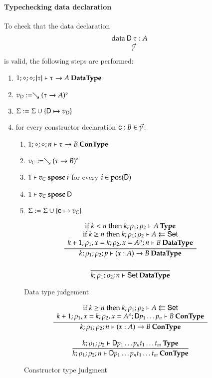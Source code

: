 \newcommand{\sposc}[3]{#1\vdash#2\mbox{ \textbf{sposc} }#3}
\newcommand{\spos}[3]{#1\vdash#2\mbox{ \textbf{spos} }#3}

\paragraph*{Typechecking data declaration}


To check that the data declaration
\[\begin{array}{l}
\data \DD \: \tau : A \\
\spcx \vec{\gamma}
\end{array}
\]
is valid, the following steps are performed: 
\begin{enumerate}
\item
$1;\diamond;\diamond;\vert\tau\vert\vdash \tau \rightarrow A\:\mathbf{DataType}$
\item
$v_D := \searrow (\tau \rightarrow A)^{\diamond}$
\item
$\mathrm{\Sigma} := \mathrm{\Sigma} \cup \{\mathsf{D} \mapsto v_D\}$
\item
for every constructor declaration $\mathsf{c} : B  \in \vec{\gamma}$:
\begin{enumerate} 
\item
$1;\diamond;\diamond;n\vdash\tau \rightarrow B\:\mathbf{ConType}$
\item
$v_C := \searrow (\tau \rightarrow B)^{\diamond}$
\item
$\sposc{1}{v_C}{i}$ for every $i \in \mbox{pos}(\mathsf{D}) $ 
\item
$\sposc{1}{v_C}{\DD}$
\item
$\mathrm{\Sigma} := \mathrm{\Sigma} \cup \{\mathsf{c} \mapsto v_C\}$
\end{enumerate}
\end{enumerate}

\newcommand{\nocc}[3]{#1\vdash#2\mbox{ \textbf{nocc} }#3}

\begin{figure}[p]
\begin{gather*}
\ \dfrac{\begin{array}[b]{c}\mbox {if } k < n \mbox{ then } k;\rho_1;\rho_2\vdash A\:\mathbf{Type}\\\mbox {if } k \geq n \mbox { then } k;\rho_1;\rho_2\vdash A\leftleftarrows\mathsf{Set}\\k+1;\rho_1,x=k;\rho_2,x=A^{\rho};n\vdash B\:\mathbf{DataType}\end{array}}{k;\rho_1;\rho_2;p\vdash( x : A ) \rightarrow{B}\:\mathbf{DataType}}
\\[2ex]
\ \dfrac{}{k;\rho_1;\rho_2;n\vdash\mathsf{Set}\:\mathbf{DataType}}
\end{gather*}
\caption{Data type judgement}
\end{figure}

\begin{figure}[p]
\begin{gather*}
\ \dfrac{\begin{array}[b]{c}\mbox {if } k \geq n \mbox { then } k;\rho_1;\rho_2\vdash A\leftleftarrows\mathsf{Set}\\k+1;\rho_1,x=k;\rho_2,x=A^{\rho};\mathsf{D} p_1 \ldots p_n\vdash B\:\mathbf{ConType}\end{array}}{k;\rho_1;\rho_2;n\vdash( x : A ) \rightarrow{B}\:\mathbf{ConType}}
\\[2ex]
\ \dfrac{k;\rho_1;\rho_2\vdash\mathsf{D} p_1 \ldots p_n t_1 \ldots t_m\:\mathbf{Type}}{k;\rho_1;\rho_2;n\vdash\mathsf{D} p_1 \ldots p_n t_1 \ldots t_m\:\mathbf{ConType}}
\end{gather*}
\caption{Constructor type judgment}
\end{figure}


